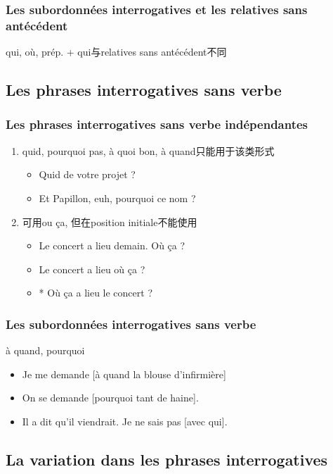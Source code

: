 \documentclass[UTF8]{report}
\begin{document}
\subsubsection{Les subordonnées interrogatives et les relatives sans antécédent}
qui, où, prép. + qui与relatives sans antécédent不同


\subsection{Les phrases interrogatives sans verbe}

\subsubsection{Les phrases interrogatives sans verbe indépendantes}
\begin{enumerate}
    \item quid, pourquoi pas, à quoi bon, à quand只能用于该类形式
    \begin{itemize}
        \item Quid de votre projet ?
        \item Et Papillon, euh, pourquoi ce nom ? 
    \end{itemize}
    \item 可用ou ça, 但在position initiale不能使用
    \begin{itemize}
        \item Le concert a lieu demain. Où ça ?
        \item Le concert a lieu où ça ?
        \item * Où ça a lieu le concert ?
    \end{itemize}
\end{enumerate}



\subsubsection{Les subordonnées interrogatives sans verbe}
à quand, pourquoi
\begin{itemize}
    \item Je me demande [à quand la blouse d’infirmière]
    \item On se demande [pourquoi tant de haine].
    \item Il a dit qu’il viendrait. Je ne sais pas [avec qui].
\end{itemize}


\subsection{La variation dans les phrases interrogatives}
\end{document}
